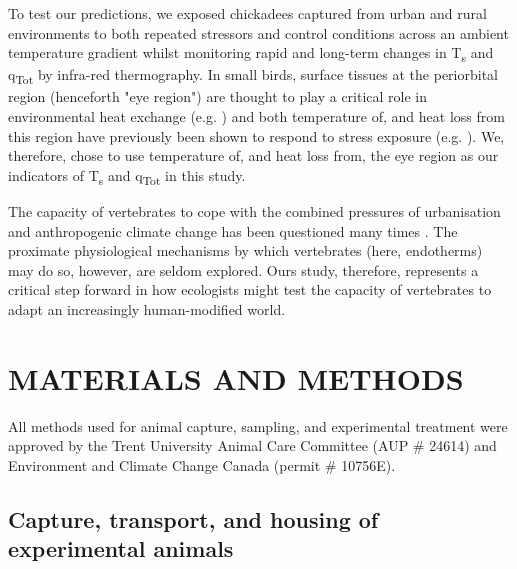 \documentclass[12pt]{article}
\begin{document}
\noindent To test our predictions, we exposed chickadees captured from urban and rural environments to both repeated stressors and control conditions across an ambient temperature gradient whilst monitoring rapid and long-term changes in T\textsubscript{s} and q\textsubscript{Tot} by infra-red thermography. In small birds, surface tissues at the periorbital region (henceforth "eye region") are thought to play a critical role in environmental heat exchange (e.g. \citealt{hill_1980,powers_2015}) and both temperature of, and heat loss from this region have previously been shown to respond to stress exposure (e.g. \citealt{jerem_2015,ikkatai_2015,herborn_2018,robertson_2020a}). We, therefore, chose to use temperature of, and heat loss from, the eye region as our indicators of T\textsubscript{s} and q\textsubscript{Tot} in this study. \vspace{1cm}

\noindent The capacity of vertebrates to cope with the combined pressures of urbanisation and anthropogenic climate change has been questioned many times \citep{pautasso_2012,argueso_2015,brans_2017}. The proximate physiological mechanisms by which vertebrates (here, endotherms) may do so, however, are seldom explored. Ours study, therefore, represents a critical step forward in how ecologists might test the capacity of vertebrates to adapt an increasingly human-modified world. \vspace{0.5cm}

\section{MATERIALS AND METHODS}
\vspace{0.5cm}

\noindent All methods used for animal capture, sampling, and experimental treatment were approved by the Trent University Animal Care Committee (AUP \# 24614) and Environment and Climate Change Canada (permit \# 10756E).\vspace{0.5cm}

\subsection{Capture, transport, and housing of experimental animals}
\vspace{0.5cm}
\end{document}

